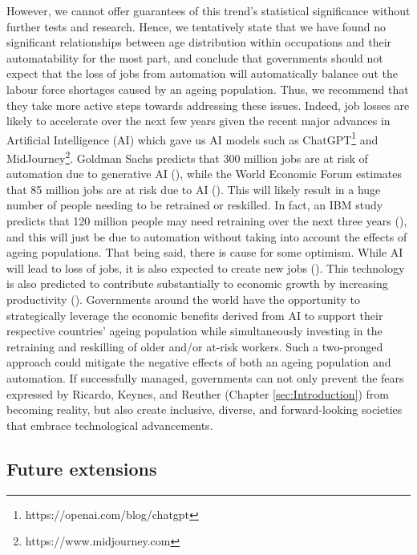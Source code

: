 \documentclass[11pt]{article}
\begin{document}
However, we cannot offer guarantees of this trend's statistical significance without further tests and research. Hence, we tentatively state that we have found no significant relationships between age distribution within occupations and their automatability for the most part, and conclude that governments should not expect that the loss of jobs from automation will automatically balance out the labour force shortages caused by an ageing population. Thus, we recommend that they take more active steps towards addressing these issues. Indeed, job losses are likely to accelerate over the next few years given the recent major advances in Artificial Intelligence (AI) which gave us AI models such as ChatGPT\footnote{https://openai.com/blog/chatgpt} and MidJourney\footnote{https://www.midjourney.com}. Goldman Sachs predicts that 300 million jobs are at risk of automation due to generative AI (\cite{hatzius2023potentially}), while the World Economic Forum estimates that 85 million jobs are at risk due to AI (\cite{world2020future}). This will likely result in a huge number of people needing to be retrained or reskilled. In fact, an IBM study predicts that 120 million people may need retraining over the next three years (\cite{laprade2019enterprise}), and this will just be due to automation without taking into account the effects of ageing populations. That being said, there is cause for some optimism. While AI will lead to loss of jobs, it is also expected to create new jobs (\cite{hawksworth_berriman_goel,world2020future}). This technology is also predicted to contribute substantially to economic growth by increasing productivity (\cite{hatzius2023potentially,laprade2019enterprise,rao_verweij}). Governments around the world have the opportunity to strategically leverage the economic benefits derived from AI to support their respective countries' ageing population while simultaneously investing in the retraining and reskilling of older and/or at-risk workers. Such a two-pronged approach could mitigate the negative effects of both an ageing population and automation. If successfully managed, governments can not only prevent the fears expressed by Ricardo, Keynes, and Reuther (Chapter \ref{sec:Introduction}) from becoming reality, but also create inclusive, diverse, and forward-looking societies that embrace technological advancements.




\subsection*{Future extensions}
\end{document}
